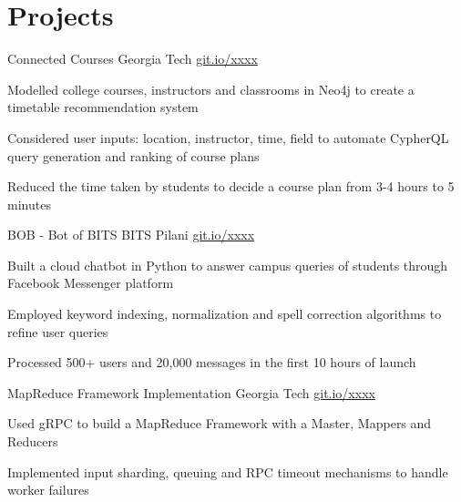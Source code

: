 \section{Projects}
\resumeSubHeadingListStart

\resumeProject
{Connected Courses}
{Georgia Tech} %
{} %
{\href{https://github.com/}{git.io/xxxx}} 
\resumeItemListStart
    \item[$\bullet$]{Modelled college courses, instructors and classrooms in Neo4j to create a timetable recommendation system}
	\item[$\bullet$]{Considered user inputs: location, instructor, time, field to automate CypherQL query generation and ranking of course plans}
	\item[$\bullet$]{Reduced the time taken by students to decide a course plan from 3-4 hours to 5 minutes}
\resumeItemListEnd


\resumeProject
{BOB - Bot of BITS} %
{BITS Pilani} %
{} %
{\href{https://github.com/}{git.io/xxxx}} %
\resumeItemListStart
\item[$\bullet$]{Built a cloud chatbot in Python to answer campus queries of students through Facebook Messenger platform}
	\item[$\bullet$]{Employed keyword indexing, normalization and spell correction algorithms to refine user queries}
	\item[$\bullet$]{Processed 500+ users and 20,000 messages in the first 10 hours of launch}
\resumeItemListEnd

\resumeProject
{MapReduce Framework Implementation} %
{Georgia Tech} %
{} %
{\href{https://github.com/}{git.io/xxxx}} %
\resumeItemListStart
\item[$\bullet$]{Used gRPC to build a MapReduce Framework with a Master, Mappers and Reducers}
	\item[$\bullet$]{Implemented input sharding, queuing and RPC timeout mechanisms to handle worker failures}
\resumeItemListEnd

\resumeSubHeadingListEnd

\vspace{-5.5mm}

